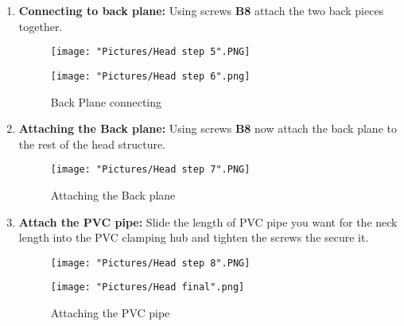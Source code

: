 \documentclass[12pt]{article}
\begin{document}
\begin{enumerate}
	\item \textbf{Connecting to back plane:} Using screws \textbf{B8} attach the two back pieces together. 

\begin{figure}[H]
	\centering
  	\begin{minipage}[b]{0.45\textwidth}
		\texttt{[image: "Pictures/Head step 5".PNG]}
  	\end{minipage}
  	\hfill
  	\begin{minipage}[b]{0.45\textwidth}
    		\texttt{[image: "Pictures/Head step 6".png]}
  	\end{minipage}
  	\caption{Back Plane connecting}
  	\label{back}
\end{figure}

	\item \textbf{Attaching the Back plane:} Using screws \textbf{B8} now attach the back plane to the rest of the head structure. 

\begin{figure}[H]
	\centering
	\texttt{[image: "Pictures/Head step 7".PNG]}
	\caption{Attaching the Back plane}
\end{figure}

	\item \textbf{Attach the PVC pipe:} Slide the length of PVC pipe you want for the neck length into the PVC clamping hub and tighten the screws the secure it.

\begin{figure}[H]
	\centering
  	\begin{minipage}[b]{0.45\textwidth}
		\texttt{[image: "Pictures/Head step 8".PNG]}
  	\end{minipage}
  	\hfill
  	\begin{minipage}[b]{0.45\textwidth}
    		\texttt{[image: "Pictures/Head final".png]}
  	\end{minipage}
  	\caption{Attaching the PVC pipe}
  	\label{pvc}
\end{figure}

\end{enumerate}
\end{document}
